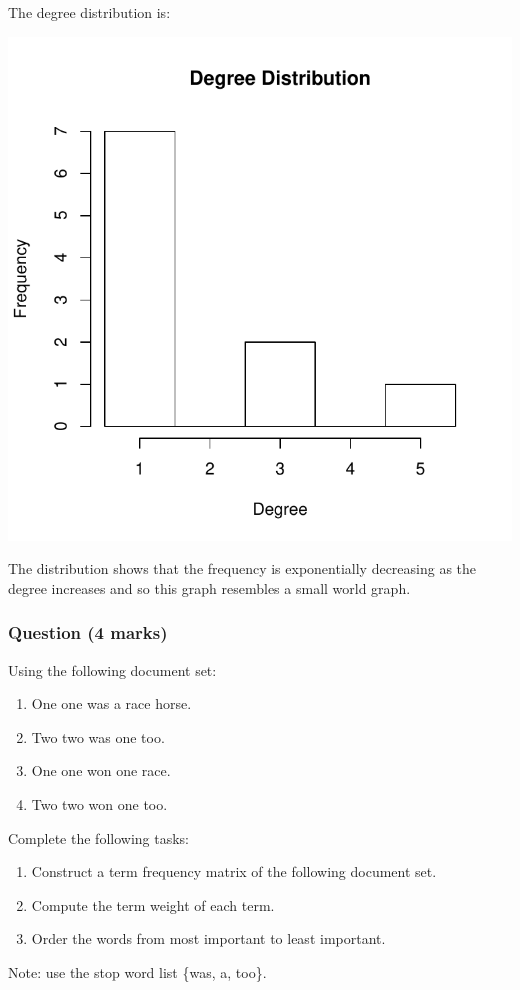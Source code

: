 \documentclass{uws_learning_guide}
\begin{document}
The degree distribution is:
\begin{center}
\includegraphics[scale=0.7]{bnetwork-dist}
\end{center}

The distribution shows that the frequency is exponentially decreasing
as the degree increases and so this graph resembles a small world
graph.


\subsubsection*{Question (4 marks)}

Using the following document set:
\begin{enumerate}
\item One one was a race horse.
\item Two two was one too.
\item One one won one race.
\item Two two won one too.
\end{enumerate}
Complete the following tasks:
\begin{enumerate}
\item Construct a term frequency matrix of the following document set.
\item Compute the term weight of each term.
\item Order the words from most important to least important.
\end{enumerate}
Note: use the stop word list \{was, a, too\}.
\end{document}
